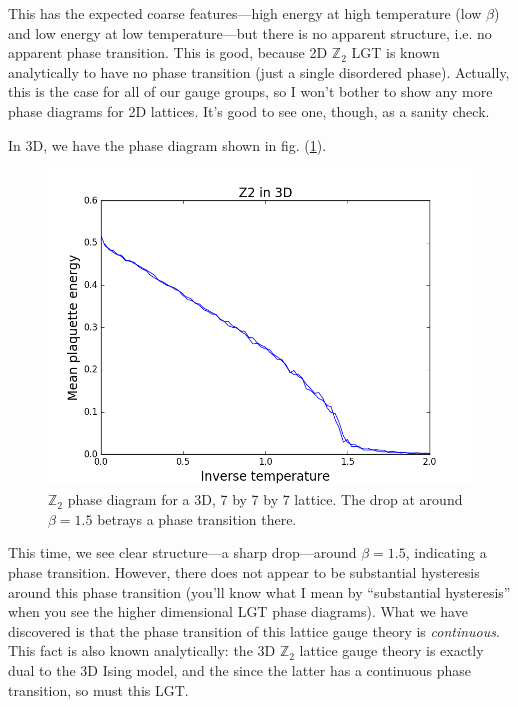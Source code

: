 \documentclass[9pt,twocolumn,twoside]{article}
\begin{document}
This has the expected coarse features---high energy at high temperature (low $\beta$) and low energy at low temperature---but there is no apparent structure, i.e. no apparent phase transition.  This is good, because 2D $\mathbb{Z}_2$ LGT is known analytically to have no phase transition (just a single disordered phase).  Actually, this is the case for all of our gauge groups, so I won't bother to show any more phase diagrams for 2D lattices.  It's good to see one, though, as a sanity check.  

In 3D, we have the phase diagram shown in fig. (\ref{z2,3d}).
\begin{figure}[h!]
	\begin{centering}
	\includegraphics[width=\columnwidth]{z2,3d}
	\caption[$\mathbb{Z}_2$ lattice gauge theory phase diagram for a 3D lattice.]{$\mathbb{Z}_2$ phase diagram for a 3D, 7 by 7 by 7 lattice.  The drop at around $\beta=1.5$ betrays a phase transition there.}
	\label{z2,3d}
	\end{centering}
\end{figure}
This time, we see clear structure---a sharp drop---around $\beta=1.5$, indicating a phase transition.  However, there does not appear to be substantial hysteresis around this phase transition (you'll know what I mean by ``substantial hysteresis'' when you see the higher dimensional LGT phase diagrams).  What we have discovered is that the phase transition of this lattice gauge theory is \textit{continuous}.  This fact is also known analytically: the 3D $\mathbb{Z}_2$ lattice gauge theory is exactly dual to the 3D Ising model, and the since the latter has a continuous phase transition, so must this LGT.
\end{document}
